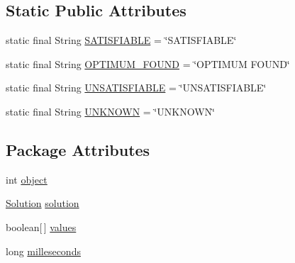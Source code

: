 \subsection*{Static Public Attributes}
\begin{DoxyCompactItemize}
\item 
static final String \hyperlink{classedu_1_1pku_1_1id_1_1pbsolver_1_1_p_b_report_a94d85825eea60ee1d00b0b8df185b0f3}{SATISFIABLE} = \char`\"{}SATISFIABLE\char`\"{}
\item 
static final String \hyperlink{classedu_1_1pku_1_1id_1_1pbsolver_1_1_p_b_report_a3dc03c88094c6d3b94f79d015dc91dbc}{OPTIMUM\_\-FOUND} = \char`\"{}OPTIMUM FOUND\char`\"{}
\item 
static final String \hyperlink{classedu_1_1pku_1_1id_1_1pbsolver_1_1_p_b_report_ad7f88216510297f2b6b6ed96a1672ea3}{UNSATISFIABLE} = \char`\"{}UNSATISFIABLE\char`\"{}
\item 
static final String \hyperlink{classedu_1_1pku_1_1id_1_1pbsolver_1_1_p_b_report_abf68ce33fec835012c92fa764c6b3bf9}{UNKNOWN} = \char`\"{}UNKNOWN\char`\"{}
\end{DoxyCompactItemize}
\subsection*{Package Attributes}
\begin{DoxyCompactItemize}
\item 
int \hyperlink{classedu_1_1pku_1_1id_1_1pbsolver_1_1_p_b_report_a8377cb6e4e24f0e618a0fa9a8072aef9}{object}
\item 
\hyperlink{classedu_1_1pku_1_1id_1_1pbsolver_1_1_p_b_report_ac8d114f4470bac0e3d21bd99f818b477}{Solution} \hyperlink{classedu_1_1pku_1_1id_1_1pbsolver_1_1_p_b_report_ab65beac0d1fd5ae85ac536441e3779a8}{solution}
\item 
boolean\mbox{[}$\,$\mbox{]} \hyperlink{classedu_1_1pku_1_1id_1_1pbsolver_1_1_p_b_report_a537a45fd8738f95aea6e043fb58bacfe}{values}
\item 
long \hyperlink{classedu_1_1pku_1_1id_1_1pbsolver_1_1_p_b_report_a0b23c36991f0012e4c3263a49c13dd53}{milleseconds}
\end{DoxyCompactItemize}


